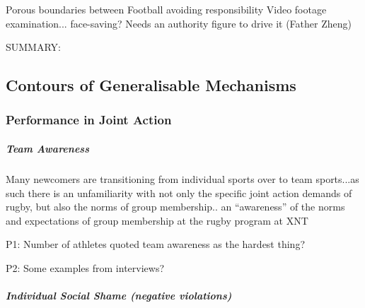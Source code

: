             Porous boundaries between
            Football avoiding responsibility
            Video footage examination... face-saving?
            Needs an authority figure to drive it (Father Zheng)









SUMMARY:


















  \subsection{Contours of Generalisable Mechanisms}

    \subsubsection{Performance in Joint Action}



          \subparagraph{Team Awareness}

          Many newcomers are transitioning from individual sports over to team sports...as such there is an unfamiliarity with not only the specific joint action demands of rugby, but also the norms of group membership.. an ``awareness'' of the norms and expectations of group membership at the rugby program at XNT

        P1: %
        Number of athletes quoted team awareness as the hardest thing?

        P2: %
        Some examples from interviews?


        \subparagraph{Individual Social Shame (negative violations)}







